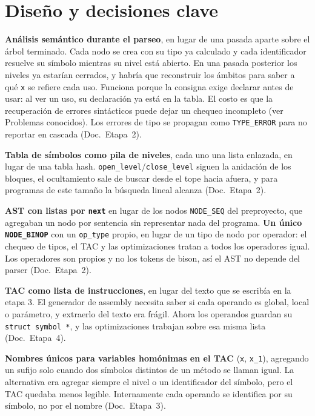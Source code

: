 \documentclass[11pt,a4paper]{article}
\newcommand{\code}[1]{\texttt{#1}}
\newcommand{\doc}[1]{(Doc.\ Etapa~#1)}
\begin{document}
\section{Diseño y decisiones clave}

\textbf{Análisis semántico durante el parseo}, en lugar de una pasada aparte sobre el árbol terminado. Cada nodo se crea con su tipo ya calculado y cada identificador resuelve su símbolo mientras su nivel está abierto. En una pasada posterior los niveles ya estarían cerrados, y habría que reconstruir los ámbitos para saber a qué \code{x} se refiere cada uso. Funciona porque la consigna exige declarar antes de usar: al ver un uso, su declaración ya está en la tabla. El costo es que la recuperación de errores sintácticos puede dejar un chequeo incompleto (ver Problemas conocidos). Los errores de tipo se propagan como \code{TYPE\_ERROR} para no reportar en cascada \doc{2}.

\textbf{Tabla de símbolos como pila de niveles}, cada uno una lista enlazada, en lugar de una tabla hash. \code{open\_level}/\code{close\_level} siguen la anidación de los bloques, el ocultamiento sale de buscar desde el tope hacia afuera, y para programas de este tamaño la búsqueda lineal alcanza \doc{2}.

\textbf{AST con listas por \code{next}} en lugar de los nodos \code{NODE\_SEQ} del preproyecto, que agregaban un nodo por sentencia sin representar nada del programa. \textbf{Un único \code{NODE\_BINOP}} con un \code{op\_type} propio, en lugar de un tipo de nodo por operador: el chequeo de tipos, el TAC y las optimizaciones tratan a todos los operadores igual. Los operadores son propios y no los tokens de bison, así el AST no depende del parser \doc{2}.

\textbf{TAC como lista de instrucciones}, en lugar del texto que se escribía en la etapa 3. El generador de assembly necesita saber si cada operando es global, local o parámetro, y extraerlo del texto era frágil. Ahora los operandos guardan su \code{struct symbol *}, y las optimizaciones trabajan sobre esa misma lista \doc{4}.

\textbf{Nombres únicos para variables homónimas en el TAC} (\code{x}, \code{x\_1}), agregando un sufijo solo cuando dos símbolos distintos de un método se llaman igual. La alternativa era agregar siempre el nivel o un identificador del símbolo, pero el TAC quedaba menos legible. Internamente cada operando se identifica por su símbolo, no por el nombre \doc{3}.
\end{document}
